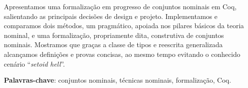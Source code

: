 \documentclass[
	12pt,				%
	oneside,
	a4paper,			%
	english,			%
	brazil				%
	]{abntex2}
\begin{document}
%
%



\setlength{\absparsep}{18pt} %
\begin{resumo}
	Apresentamos uma formalização em progresso de conjuntos nominais em Coq, salientando as principais decisões de design e projeto. Implementamos e comparamos dois métodos, um pragmático, apoiada nos pilares básicos da teoria nominal, e uma formalização, propriamente dita, construtiva de conjuntos nominais. Mostramos que graças a classe de tipos e reescrita generalizada alcançamos definições e provas concisas, ao mesmo tempo evitando o conhecido cenário ``\textit{setoid hell}''.

 \textbf{Palavras-chave}: conjuntos nominais, técnicas nominais, formalização, Coq.
\end{resumo}
\end{document}

